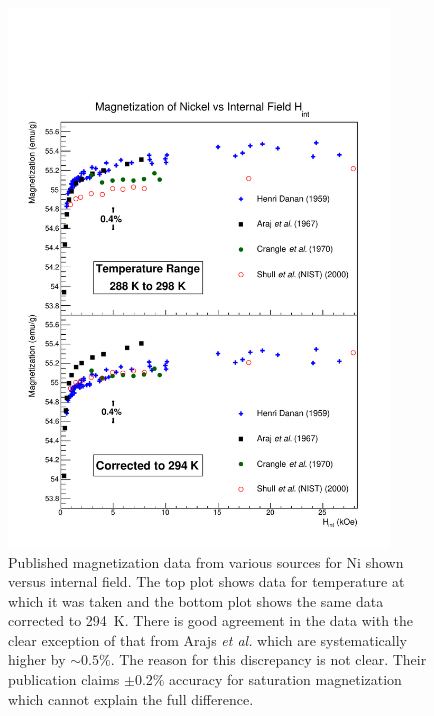 \documentclass[preprint,12pt]{elsarticle}
\begin{document}
\begin{figure}
\centering
\includegraphics[width=0.9\textwidth]{NiMagnetization_vs_Hint.pdf}
\caption{Published magnetization data from various sources for Ni shown versus internal field. The top plot shows data for temperature at which it was taken and the bottom plot shows the same data corrected to 294~K. There is good agreement in the data with the clear exception of that from Arajs {\it et al.} which are systematically higher by $\sim0.5\%$. The reason for this discrepancy is not clear. Their publication claims $\pm$0.2\% accuracy for saturation magnetization which cannot explain the full difference.}
\label{fig:mag_Ni}
\end{figure}
\end{document}
